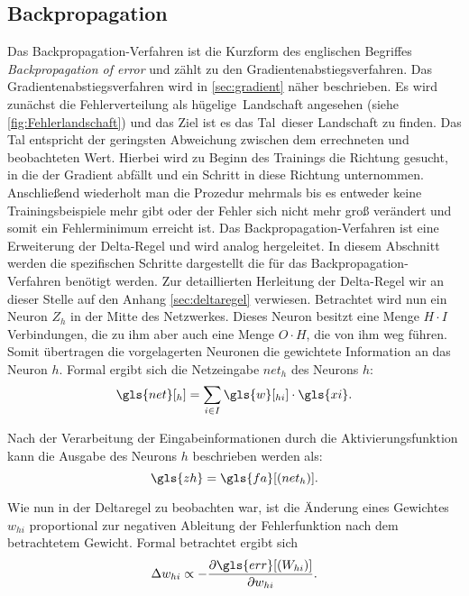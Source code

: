 \subsection{Backpropagation}\label{sec:Backpropagation}
Das Backpropagation-Verfahren ist die Kurzform des englischen Begriffes \textit{Backpropagation of error} und zählt zu den Gradientenabstiegsverfahren. Das Gradientenabstiegsverfahren wird in \autoref{sec:gradient} näher beschrieben. Es wird zunächst die Fehlerverteilung als \glqq hügelige\grqq~Landschaft angesehen (siehe \autoref{fig:Fehlerlandschaft}) und das Ziel ist es das \glqq Tal\grqq~dieser Landschaft zu finden. Das Tal entspricht der geringsten Abweichung zwischen dem errechneten und beobachteten Wert. Hierbei wird zu Beginn des Trainings die Richtung gesucht, in die der Gradient abfällt und ein Schritt in diese Richtung unternommen. Anschließend wiederholt man die Prozedur mehrmals bis es entweder keine Trainingsbeispiele mehr gibt oder der Fehler sich nicht mehr groß verändert und somit ein Fehlerminimum erreicht ist. Das Backpropagation-Verfahren ist eine Erweiterung der Delta-Regel und wird analog hergeleitet. In diesem Abschnitt werden die spezifischen Schritte dargestellt die für das Backpropagation-Verfahren benötigt werden. Zur detaillierten Herleitung der Delta-Regel wir an dieser Stelle auf den Anhang \ref{sec:deltaregel} verwiesen.
Betrachtet wird nun ein Neuron $Z_h$ in der Mitte des Netzwerkes. Dieses Neuron besitzt eine Menge $H \cdot I$ Verbindungen, die zu ihm aber auch eine Menge $O \cdot H$, die von ihm weg führen. Somit übertragen die vorgelagerten Neuronen die gewichtete Information an das Neuron $h$. Formal ergibt sich die Netzeingabe $net_{h}$ des Neurons $h$:
\begin{equation}
\gls{net}[_{h}] = \sum_{i \in I} \gls{w}[_{hi}] \cdot \gls{xi} .
\label{gl:neth}
\end{equation}

Nach der Verarbeitung der Eingabeinformationen durch die Aktivierungsfunktion kann die Ausgabe des Neurons $h$ beschrieben werden als:
\begin{equation}
\gls{zh}= \gls{fa}[(net_{h})] . %
\label{gl:aktiv}
\end{equation}

Wie nun in der Deltaregel zu beobachten war, ist die Änderung eines Gewichtes $w_{hi}$ proportional zur negativen Ableitung der Fehlerfunktion nach dem betrachtetem Gewicht. Formal betrachtet ergibt sich
\begin{equation*}
\Delta w_{hi} \propto -  \frac{\partial \gls{err}[(W_{hi})]}{\partial w_{hi}}.
\end{equation*}


